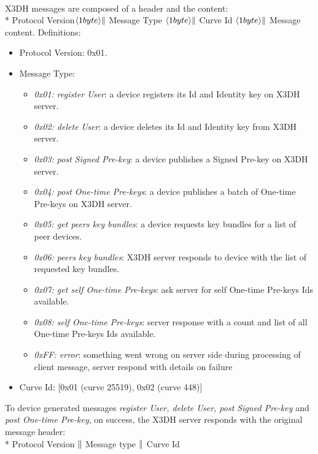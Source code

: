\documentclass[a4paper,11pt]{article}
\begin{document}
    \paragraph*{}X3DH messages are composed of a header and the content:\\*
    Protocol Version$\langle 1byte\rangle \Arrowvert $ Message Type $\langle 1byte\rangle \Arrowvert $ Curve Id $\langle 1byte\rangle \Arrowvert $ Message content.
    Definitions:
      \begin{itemize}
      \item Protocol Version: 0x01.
      \item Message Type:
        \begin{itemize}
          \item \textit{0x01: register User}: a device registers its Id and Identity key on X3DH server.
          \item \textit{0x02: delete User}: a device deletes its Id and Identity key from X3DH server.
          \item \textit{0x03: post Signed Pre-key}: a device publishes a Signed Pre-key on X3DH server.
          \item \textit{0x04: post One-time Pre-keys}: a device publishes a batch of One-time Pre-keys on X3DH server.
          \item \textit{0x05: get peers key bundles}: a device requests key bundles for a list of peer devices.
          \item \textit{0x06: peers key bundles}: X3DH server responds to device with the list of requested key bundles.
          \item \textit{0x07: get self One-time Pre-keys}: ask server for self One-time Pre-keys Ids available.
          \item \textit{0x08: self One-time Pre-keys}: server response with a count and list of all One-time Pre-keys Ids available.          
          \item \textit{0xFF: error}: something went wrong on server side during processing of client message, server respond with details on failure
        \end{itemize}
      \item Curve Id: [0x01 (curve 25519), 0x02 (curve 448)]
      \end{itemize}
    
    To device generated messages \textit{register User, delete User, post Signed Pre-key} and \textit{post One-time Pre-key}, on success, the X3DH server responds with the original message header:\\*
    Protocol Version $\Arrowvert $ Message type $\Arrowvert $ Curve Id
\end{document}
